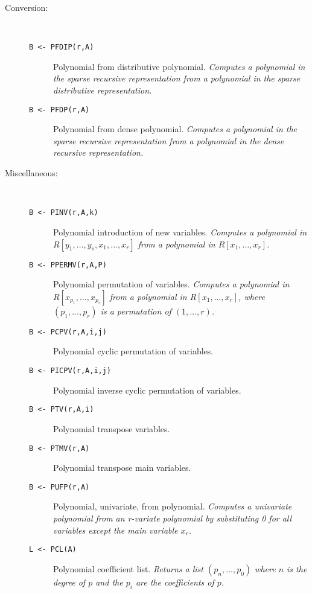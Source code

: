 \begin{description}
\item[Conversion\footnotemark :] \ \
  \begin{description}
  \item[{\tt B <- PFDIP(r,A) 
}]  Polynomial from distributive polynomial. {\em Computes a
  polynomial in the sparse recursive representation from a polynomial in
  the sparse distributive representation.}
  \item[{\tt B <- PFDP(r,A) 
}]  Polynomial from dense polynomial. {\em Computes a polynomial
  in the sparse recursive representation from a polynomial in the dense
  recursive representation.}
  \end{description}

\item[Miscellaneous:] \ \
  \begin{description}
  \item[{\tt B <- PINV(r,A,k) 
}]  Polynomial introduction of new variables. {\em Computes a
    polynomial in $R[y_1, \ldots, y_s, x_1, \ldots, x_r]$ from a polynomial
    in $R[x_1,\ldots,x_r]$.}
  \item[{\tt B <- PPERMV(r,A,P) 
}]  Polynomial permutation of variables. {\em Computes a
    polynomial in $R[x_{p_1}, \ldots, x_{p_r}]$ from a polynomial in
    $R[x_1, \ldots, x_r]$, where $(p_1, \ldots, p_r)$ is a permutation of
    $(1, \ldots, r)$.}
  \item[{\tt B <- PCPV(r,A,i,j) 
}]  Polynomial cyclic permutation of variables.
  \item[{\tt B <- PICPV(r,A,i,j) 
}]\index{PICPV}  Polynomial inverse cyclic permutation of variables.
  \item[{\tt B <- PTV(r,A,i) 
}]\index{PTV}  Polynomial transpose variables.
  \item[{\tt B <- PTMV(r,A) 
}]\index{PTMV}  Polynomial transpose main variables.
  \item[{\tt B <- PUFP(r,A) 
}]\index{PUFP}  Polynomial, univariate, from polynomial. {\em Computes a
    univariate polynomial from an r-variate polynomial by substituting
    0 for all variables except the main variable $x_r$.}
  \item[{\tt L <- PCL(A) 
}]\index{PCL}  Polynomial coefficient list. {\em Returns a list
    $(p_n,\ldots,p_0)$ where $n$ is the degree of $p$ and the $p_i$ are the
    coefficients of $p$.}
  \end{description}

\end{description}

